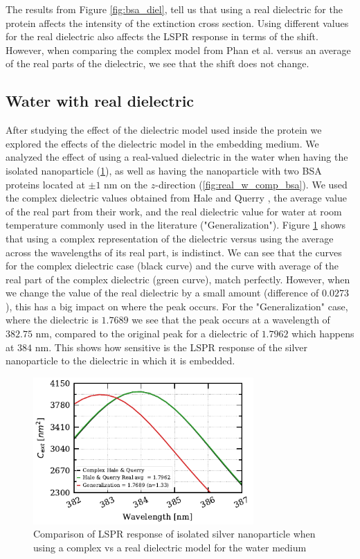 The results from Figure \ref{fig:bsa_diel}, tell us that using a real dielectric for the protein affects the intensity of the extinction cross section. Using 
different values for the real dielectric also affects the LSPR response in terms of the shift. However, when comparing the complex model from Phan et al. versus
an average of the real parts of the dielectric, we see that the shift does not change. 

\subsection{Water with real dielectric}

After studying the effect of the dielectric model used inside the protein we explored the effects of the dielectric model in the 
embedding medium. We analyzed the effect of using a real-valued dielectric in the water when having the isolated nanoparticle (\ref{fig:iso_NP_diel}), 
as well as having the nanoparticle with two BSA proteins located at $\pm1$ nm on the $z$-direction (\ref{fig:real_w_comp_bsa}). We used
the complex dielectric values obtained from Hale and Querry \cite{HaleQuerry1972}, the average value of the real part from their work, and the real 
dielectric value for water at room temperature commonly used in the literature ("Generalization"). Figure \ref{fig:iso_NP_diel} shows
that using a complex representation of the dielectric versus using the average across the wavelengths of its real part, is indistinct. We can see that the curves
for the complex dielectric case (black curve) and the curve with average of the real part of the complex dielectric (green curve), match perfectly. However, when we
change the value of the real dielectric by a small amount (difference of $0.0273$), this has a big impact on where the peak occurs. For the "Generalization" case, where 
the dielectric is $1.7689$ we see that the peak occurs at a wavelength of $382.75$ nm, compared to the original peak for a dielectric of $1.7962$ which happens at $384$ nm. This shows
how sensitive is the LSPR response of the silver nanoparticle to the dielectric in which it is embedded. 
 
\begin{figure} %
    \centering
    \includegraphics[width=0.75\textwidth]{iso_np_water_diel_study.pdf} 
    \caption{Comparison of LSPR response of isolated silver nanoparticle when using a complex 
     vs a real dielectric model for the water medium}
    \label{fig:iso_NP_diel}
 \end{figure}

